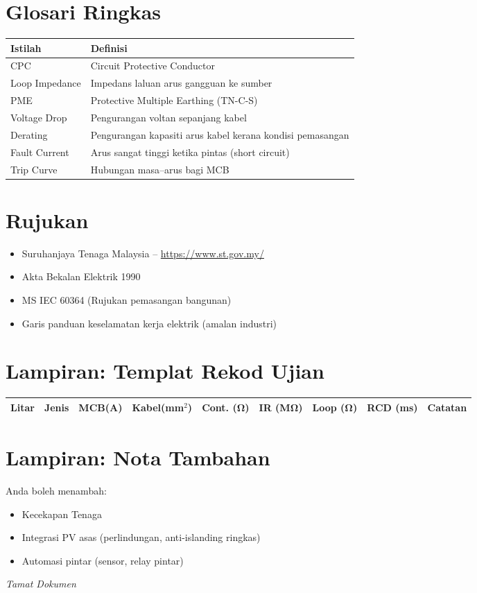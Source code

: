 \documentclass[12pt,a4paper,oneside]{scrreprt}
\begin{document}
\chapter{Glosari Ringkas}
\begin{tabular}{p{3cm}p{10cm}}
\toprule
Istilah & Definisi \\
\midrule
CPC & Circuit Protective Conductor \\
Loop Impedance & Impedans laluan arus gangguan ke sumber \\
PME & Protective Multiple Earthing (TN-C-S) \\
Voltage Drop & Pengurangan voltan sepanjang kabel \\
Derating & Pengurangan kapasiti arus kabel kerana kondisi pemasangan \\
Fault Current & Arus sangat tinggi ketika pintas (short circuit) \\
Trip Curve & Hubungan masa–arus bagi MCB \\
\bottomrule
\end{tabular}

\chapter{Rujukan}
\begin{itemize}
  \item Suruhanjaya Tenaga Malaysia – \url{https://www.st.gov.my/}
  \item Akta Bekalan Elektrik 1990
  \item MS IEC 60364 (Rujukan pemasangan bangunan)
  \item Garis panduan keselamatan kerja elektrik (amalan industri)
\end{itemize}

\appendix
\chapter{Lampiran: Templat Rekod Ujian}
\begin{longtable}{p{1.4cm}p{1.5cm}p{1.2cm}p{1.5cm}p{1.8cm}p{1.8cm}p{1.5cm}p{1.6cm}p{2cm}}
\toprule
Litar & Jenis & MCB(A) & Kabel(mm$^2$) & Cont. (Ω) & IR (MΩ) & Loop (Ω) & RCD (ms) & Catatan \\
\midrule
\endhead
\bottomrule
\end{longtable}

\chapter{Lampiran: Nota Tambahan}
Anda boleh menambah:
\begin{itemize}
  \item Kecekapan Tenaga
  \item Integrasi PV asas (perlindungan, anti-islanding ringkas)
  \item Automasi pintar (sensor, relay pintar)
\end{itemize}

\vfill
\begin{center}
\textit{Tamat Dokumen}
\end{center}
\end{document}

